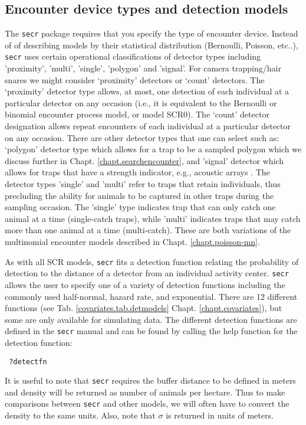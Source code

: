 \subsection{Encounter device types and detection models}

The
\mbox{\tt secr} package requires that you specify the type of encounter
device. 
Instead of of 
describing models by their statistical distribution (Bernoulli,
Poisson, etc..), 
 \mbox{\tt secr} 
uses certain operational classifications of detector types including
'proximity', 'multi', 'single', 'polygon' and 'signal'.
For 
camera trapping/hair snares we might consider `proximity' detectors or `count'
detectors.  The `proximity' detector type allows, at most, one
detection of each individual at a particular detector on any occasion
(i.e., it is equivalent to the Bernoulli or binomial encounter process
model, or model SCR0).
The `count' detector designation allows repeat encounters of each
individual at a particular detector on any occasion.  There are other
detector types that one can select such as: `polygon' detector type
which allows for a trap to be a sampled polygon
\citep{royle_young:2008} which we discuss further in Chapt. \ref{chapt.searchencounter},
and 'signal' detector which allows for traps that have a strength
indicator, e.g., acoustic arrays \citep{dawson_efford:2009}.
The detector types 'single' and 'multi' 
refer to traps that retain individuals, thus precluding the ability
for animals to be captured in other traps during the sampling
occasion.  The 'single' type indicates trap that can only catch one
animal at a time (single-catch traps), while 'multi' indicates traps that may catch more
than one animal at a time (multi-catch). These are both variations of
the multinomial encounter models described in
Chapt. \ref{chapt.poisson-mn}.

As with all SCR models, \mbox{\tt secr} fits a detection function relating
the probability of detection to the distance of a detector from an
individual activity center. \mbox{\tt secr} allows the user to specify one of a
variety of detection functions including the commonly used
half-normal, hazard rate, and exponential.  There are 12 different
functions (see Tab. \ref{covariates.tab.detmodels} Chapt. \ref{chapt.covariates}), but
some are only available for simulating data.
The different detection functions are defined in
the \mbox{\tt secr} manual and can be found by calling the help function for the
detection function:
\begin{verbatim}
 ?detectfn
\end{verbatim}
It is useful to note that \mbox{\tt secr} requires the buffer distance to be
defined in meters and density will be returned as number of animals
per hectare.  Thus to make comparisons between \mbox{\tt secr} and other models,
we will often have to convert the density to the same units.  Also,
note that $\sigma$ is returned in units of meters.


